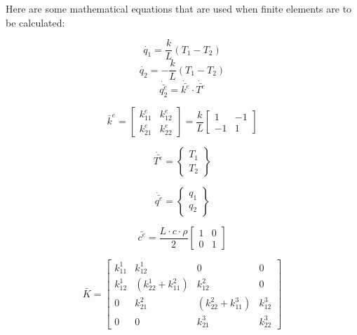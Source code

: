 \maketitle
Here are some mathematical equations that are used when finite elements are to be calculated:

\begin{equation}
    \dot{q_1} = {\frac{k}{L}}(T_1-T_2)
\end{equation}
\begin{equation}
    \dot{q_2} = -{\frac{k}{L}}(T_1-T_2)
\end{equation}
\begin{equation}
    \dot{\bar{q_2^e}} = \dot{\bar{k^e}}\cdot\dot{\bar{T^e}}
\end{equation}

\begin{equation}
    \bar{k}^e = 
    \begin{bmatrix}
        k_{11}^e & k_{12}^e \\
        k_{21}^e & k_{22}^e
    \end{bmatrix}
     = \frac{k}{L}
     \begin{bmatrix}
         1 & -1 \\
         -1 & 1
     \end{bmatrix}
\end{equation}

\begin{equation}
\dot{\bar{T^e}} = 
    \begin{Bmatrix}
    T_1 \\ T_2
    \end{Bmatrix}
\end{equation}

\begin{equation}
\dot{\bar{q^e}} = 
    \begin{Bmatrix}
    q_1 \\ q_2
    \end{Bmatrix}
\end{equation}

\begin{equation}
    \bar{c^e} = \frac{L \cdot c \cdot \rho}{2}
    \begin{bmatrix}
        1 & 0 \\ 0 & 1
    \end{bmatrix}
\end{equation}

\begin{equation}
    \bar{K} = 
    \begin{bmatrix}
        k_{11}^1 & k_{12}^1 & 0 & 0 \\
        k_{12}^1 & (k_{22}^1 + k_{11}^2) & k_{12}^2 & 0 \\
        0 & k_{21}^2 & (k_{22}^2 + k_{11}^3) & k_{12}^3 \\
        0 & 0 & k_{21}^3 & k_{22}^3
    \end{bmatrix}
\end{equation}

